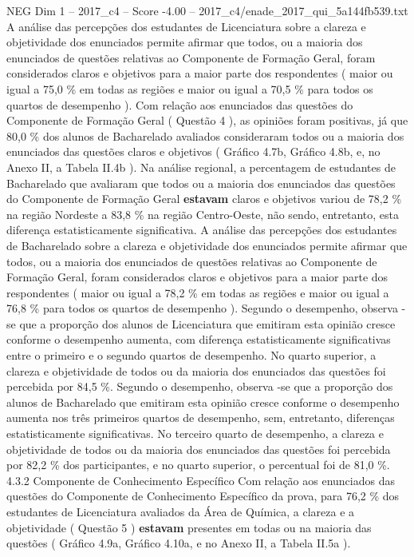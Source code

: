 \begin{textsample}{NEG Dim 1 – 2017\_c4 – Score -4.00 – 2017\_c4/enade\_2017\_qui\_5a144fb539.txt}
A análise das percepções dos estudantes de Licenciatura sobre a clareza e objetividade dos enunciados permite afirmar que todos, ou a maioria dos enunciados de questões relativas ao Componente de Formação Geral, foram considerados claros e objetivos para a maior parte dos respondentes ( maior ou igual a 75,0 \% em todas as regiões e maior ou igual a 70,5 \% para todos os quartos de desempenho ).
Com relação aos enunciados das questões do Componente de Formação Geral ( Questão 4 ), as opiniões foram positivas, já que 80,0 \% dos alunos de Bacharelado avaliados consideraram todos ou a maioria dos enunciados das questões claros e objetivos ( Gráfico 4.7b, Gráfico 4.8b, e, no Anexo II, a Tabela II.4b ).
Na análise regional, a percentagem de estudantes de Bacharelado que avaliaram que todos ou a maioria dos enunciados das questões do Componente de Formação Geral \textbf{estavam} claros e objetivos variou de 78,2 \% na região Nordeste a 83,8 \% na região Centro-Oeste, não sendo, entretanto, esta diferença estatisticamente significativa.
A análise das percepções dos estudantes de Bacharelado sobre a clareza e objetividade dos enunciados permite afirmar que todos, ou a maioria dos enunciados de questões relativas ao Componente de Formação Geral, foram considerados claros e objetivos para a maior parte dos respondentes ( maior ou igual a 78,2 \% em todas as regiões e maior ou igual a 76,8 \% para todos os quartos de desempenho ).
Segundo o desempenho, observa -se que a proporção dos alunos de Licenciatura que emitiram esta opinião cresce conforme o desempenho aumenta, com diferença estatisticamente significativas entre o primeiro e o segundo quartos de desempenho.
No quarto superior, a clareza e objetividade de todos ou da maioria dos enunciados das questões foi percebida por 84,5 \%.
Segundo o desempenho, observa -se que a proporção dos alunos de Bacharelado que emitiram esta opinião cresce conforme o desempenho aumenta nos três primeiros quartos de desempenho, sem, entretanto, diferenças estatisticamente significativas.
No terceiro quarto de desempenho, a clareza e objetividade de todos ou da maioria dos enunciados das questões foi percebida por 82,2 \% dos participantes, e no quarto superior, o percentual foi de 81,0 \%. 4.3.2 Componente de Conhecimento Específico Com relação aos enunciados das questões do Componente de Conhecimento Específico da prova, para 76,2 \% dos estudantes de Licenciatura avaliados da Área de Química, a clareza e a objetividade ( Questão 5 ) \textbf{estavam} presentes em todas ou na maioria das questões ( Gráfico 4.9a, Gráfico 4.10a, e no Anexo II, a Tabela II.5a ).

\end{textsample}
